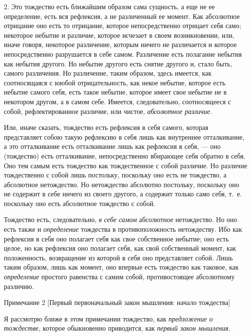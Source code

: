 2. Это тождество есть ближайшим образом сама сущность, а еще не ее
определение, есть вся рефлексия, а не различенный ее момент. Как абсолютное
отрицание оно есть то отрицание, которое непосредственно отрицает себя
само; некоторое небытие и различие, которое исчезает в своем возникновении,
или, иначе говоря, некоторое различение, которым ничего не различается и
которое непосредственно разрушается в себе самом. Различение есть полагание
небытия как небытия другого. Но небытие другого есть снятие другого и,
стало быть, самого различения. Но различение, таким образом, здесь имеется,
как соотносящаяся с ююбой отрицательность, как некое небытие, которое есть
небытие самого себя, есть такое небытие, которое имеет свое небытие не в
некотором другом, а в самом себе. Имеется, следовательно, соотносящееся с
собой, рефлектированное различие, или чистое,
{\em абсолютное различие}.

Или, иначе сказать, тождество есть рефлексия в себя самого, которая
представляет собою такую рефлексию в себя лишь как внутреннее отталкивание,
а это отталкивание есть отталкивание лишь как рефлексия в себя, — оно
(тождество) есть отталкивание, непосредственно вбирающее себя обратно в
себя. Оно тем самым есть тождество как тождественное с собой различие. Но
различие тождественно с собой лишь постольку, поскольку оно есть не
тождество, а абсолютное нетождество. Но нетождество абсолютно постольку,
поскольку оно не содержит в себе ничего из своего другого, а содержит
только само себя, т.~е. поскольку оно есть абсолютное тождество с собой.

Тождество есть, следовательно, {\em в себе самом}
абсолютное нетождество. Но оно есть также и
{\em определение} тождества в противоположность
нетождеству. Ибо как рефлексия в себя оно полагает себя как свое
собственное небытие; оно есть целое, но как рефлексия оно полагает себя,
как свой собственный момент, как положенность, возвращение из которой в
себя оно представляет собой. Лишь таким образом, лишь как момент, оно
впервые есть тождество как таковое, как
{\em определение} простого равенства с самим собой,
противостоящее абсолютному различию.

{\centering
Примечание 2
[Первый первоначальный закон мышления: начало тождества]
\par}

Я рассмотрю ближе в этом примечании тождество, как
{\em предложение о тождестве}, которое обыкновенно
приводится, как {\em первый закон мышления}.

